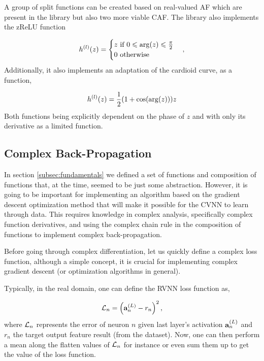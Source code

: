 A group of split functions can be created based on real-valued \gls{AF} which are present in the library but also two more viable \gls{CAF}. The library also implements the zReLU function

\begin{equation}
	h^{(l)}(z) = 
	\begin{cases}
		z \ \text{if} \  0 \leqslant \arg(z) \leqslant \frac{\pi}{2} \\
		0 \  \text{otherwise}
	\end{cases},
\end{equation}
Additionally, it also implements an adaptation of the cardioid curve, as a function,

\begin{equation}
	h^{(l)}(z) = \dfrac{1}{2} ( 1 + \cos(\arg(z)) ) z
\end{equation}
Both functions being explicitly dependent on the phase of $ z $ and with only its derivative as a limited function.

\subsection{Complex Back-Propagation}
In section \ref{subsec:fundamentals} we defined a set of functions and composition of functions that, at the time, seemed to be just some abstraction. However, it is going to be important for implementing an algorithm based on the gradient descent optimization method that will make it possible for the \gls{CVNN} to learn through data. This requires knowledge in complex analysis, specifically complex function derivatives, and using the complex chain rule in the composition of functions to implement complex back-propagation.

Before going through complex differentiation, let us quickly define a complex loss function, although a simple concept, it is crucial for implementing complex gradient descent (or optimization algorithms in general).

Typically, in the real domain, one can define the \gls{RVNN} loss function as,

\begin{equation}
	\mathcal{L}_n = \left( \mathbf{a}^{(L)}_{n} - r_n \right)^2,
\end{equation}
where $ \mathcal{L}_n $ represents the error of neuron $ n $ given last layer's activation $ \mathbf{a}^{(L)}_{n} $ and $ r_n $ the target output feature result (from the dataset). Now, one can then perform a mean along the flatten values of $ \mathcal{L}_n $ for instance or even sum them up to get the value of the loss function. 

